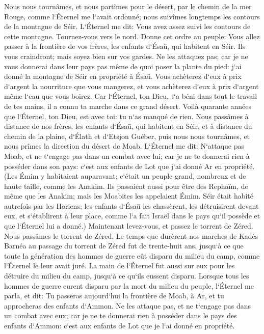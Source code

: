 \verse Nous nous tournâmes, et nous partîmes pour le désert, par le chemin de la mer Rouge, comme l`Éternel me l`avait ordonné; nous suivîmes longtemps les contours de la montagne de Séir. 
\verse L`Éternel me dit: 
\verse Vous avez assez suivi les contours de cette montagne. Tournez-vous vers le nord. 
\verse Donne cet ordre au peuple: Vous allez passer à la frontière de vos frères, les enfants d`Ésaü, qui habitent en Séir. Ils vous craindront; mais soyez bien sur vos gardes. 
\verse Ne les attaquez pas; car je ne vous donnerai dans leur pays pas même de quoi poser la plante du pied: j`ai donné la montagne de Séir en propriété à Ésaü. 
\verse Vous achèterez d`eux à prix d`argent la nourriture que vous mangerez, et vous achèterez d`eux à prix d`argent même l`eau que vous boirez. 
\verse Car l`Éternel, ton Dieu, t`a béni dans tout le travail de tes mains, il a connu ta marche dans ce grand désert. Voilà quarante années que l`Éternel, ton Dieu, est avec toi: tu n`as manqué de rien. 
\verse Nous passâmes à distance de nos frères, les enfants d`Ésaü, qui habitent en Séir, et à distance du chemin de la plaine, d`Élath et d`Etsjon Guéber, puis nous nous tournâmes, et nous prîmes la direction du désert de Moab. 
\verse L`Éternel me dit: N`attaque pas Moab, et ne t`engage pas dans un combat avec lui; car je ne te donnerai rien à posséder dans son pays: c`est aux enfants de Lot que j`ai donné Ar en propriété. 
\verse (Les Émim y habitaient auparavant; c`était un peuple grand, nombreux et de haute taille, comme les Anakim. 
\verse Ils passaient aussi pour être des Rephaïm, de même que les Anakim; mais les Moabites les appelaient Émim. 
\verse Séir était habité autrefois par les Horiens; les enfants d`Ésaü les chassèrent, les détruisirent devant eux, et s`établirent à leur place, comme l`a fait Israël dans le pays qu`il possède et que l`Éternel lui a donné.) 
\verse Maintenant levez-vous, et passez le torrent de Zéred. Nous passâmes le torrent de Zéred. 
\verse Le temps que durèrent nos marches de Kadès Barnéa au passage du torrent de Zéred fut de trente-huit ans, jusqu`à ce que toute la génération des hommes de guerre eût disparu du milieu du camp, comme l`Éternel le leur avait juré. 
\verse La main de l`Éternel fut aussi sur eux pour les détruire du milieu du camp, jusqu`à ce qu`ils eussent disparu. 
\verse Lorsque tous les hommes de guerre eurent disparu par la mort du milieu du peuple, 
\verse l`Éternel me parla, et dit: 
\verse Tu passeras aujourd`hui la frontière de Moab, à Ar, 
\verse et tu approcheras des enfants d`Ammon. Ne les attaque pas, et ne t`engage pas dans un combat avec eux; car je ne te donnerai rien à posséder dans le pays des enfants d`Ammon: c`est aux enfants de Lot que je l`ai donné en propriété. 
